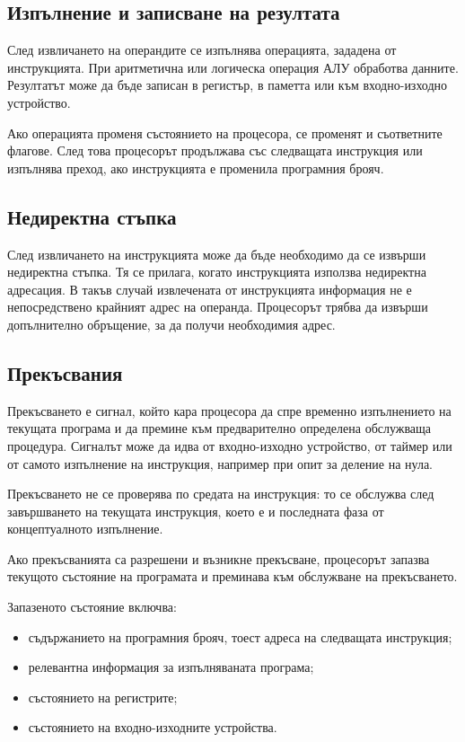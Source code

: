 \subsection{Изпълнение и записване на резултата}\label{s:9.4.4}

След извличането на операндите се изпълнява операцията, зададена от инструкцията. При аритметична или логическа операция АЛУ обработва данните. Резултатът може да бъде записан в регистър, в паметта или към входно-изходно устройство.

Ако операцията променя състоянието на процесора, се променят и съответните флагове. След това процесорът продължава със следващата инструкция или изпълнява преход, ако инструкцията е променила програмния брояч.

\subsection{Недиректна стъпка}\label{s:9.4.5}

След извличането на инструкцията може да бъде необходимо да се извърши недиректна стъпка. Тя се прилага, когато инструкцията използва недиректна адресация. В такъв случай извлечената от инструкцията информация не е непосредствено крайният адрес на операнда. Процесорът трябва да извърши допълнително обръщение, за да получи необходимия адрес.

\subsection{Прекъсвания}\label{s:9.4.6}

\begin{defn}[Прекъсване]
Прекъсването е сигнал, който кара процесора да спре временно изпълнението на текущата програма и да премине към предварително определена обслужваща процедура. Сигналът може да идва от входно-изходно устройство, от таймер или от самото изпълнение на инструкция, например при опит за деление на нула.

Прекъсването не се проверява по средата на инструкция: то се обслужва след завършването на текущата инструкция, което е и последната фаза от концептуалното изпълнение.
\end{defn}

Ако прекъсванията са разрешени и възникне прекъсване, процесорът запазва текущото състояние на програмата и преминава към обслужване на прекъсването.

Запазеното състояние включва:

\begin{itemize}
    \item съдържанието на програмния брояч, тоест адреса на следващата инструкция;
    \item релевантна информация за изпълняваната програма;
    \item състоянието на регистрите;
    \item състоянието на входно-изходните устройства.
\end{itemize}

